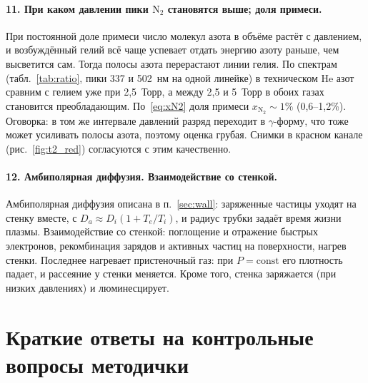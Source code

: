 \documentclass[12pt,a4paper]{article}
\newcommand{\Nt}{\mathrm{N_2}}
\begin{document}
\paragraph{11. При каком давлении пики $\Nt$ становятся выше; доля примеси.}
При постоянной доле примеси число молекул азота в объёме растёт с
давлением, и возбуждённый гелий всё чаще успевает отдать энергию азоту
раньше, чем высветится сам. Тогда полосы азота перерастают линии гелия.
По спектрам (табл.~\ref{tab:ratio}, пики 337 и 502~нм на одной линейке)
в техническом He азот сравним с гелием уже при 2,5~Торр, а между 2,5 и
5~Торр в обоих газах становится преобладающим. По~\eqref{eq:xN2} доля
примеси $x_{\Nt}\sim 1\%$ (0,6--1,2\%). Оговорка: в том же интервале
давлений разряд переходит в $\gamma$-форму, что тоже может усиливать
полосы азота, поэтому оценка грубая. Снимки в красном канале
(рис.~\ref{fig:t2_red}) согласуются с этим качественно.

\paragraph{12. Амбиполярная диффузия. Взаимодействие со стенкой.}
Амбиполярная диффузия описана в п.~\ref{sec:wall}: заряженные частицы уходят
на стенку вместе, с $D_a \approx D_i(1+T_e/T_i)$, и радиус трубки
задаёт время жизни плазмы. Взаимодействие со стенкой: поглощение и
отражение быстрых электронов, рекомбинация зарядов и активных частиц на
поверхности, нагрев стенки. Последнее нагревает пристеночный газ: при
$P = \text{const}$ его плотность падает, и рассеяние у стенки меняется.
Кроме того, стенка заряжается (при низких давлениях) и люминесцирует.

\appendix
\section{Краткие ответы на контрольные вопросы методички}
\end{document}
